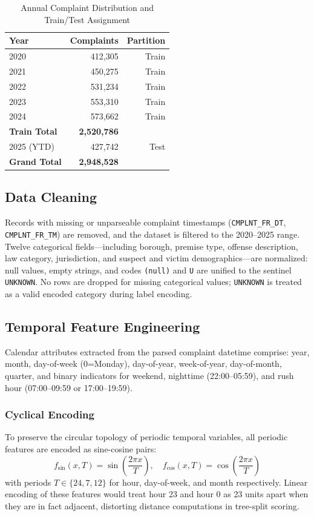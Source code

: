 \documentclass[conference]{IEEEtran}
\begin{document}
\begin{table}[h]
\centering
\caption{Annual Complaint Distribution and Train/Test Assignment}
\label{tab:dataset_stats}
\begin{tabular}{@{}lrr@{}}
\toprule
\textbf{Year} & \textbf{Complaints} & \textbf{Partition} \\
\midrule
2020 & 412,305 & Train \\
2021 & 450,275 & Train \\
2022 & 531,234 & Train \\
2023 & 553,310 & Train \\
2024 & 573,662 & Train \\
\midrule
\textbf{Train Total} & \textbf{2,520,786} & \\
\midrule
2025 (YTD) & 427,742 & Test \\
\midrule
\textbf{Grand Total} & \textbf{2,948,528} & \\
\bottomrule
\end{tabular}
\end{table}

\subsection{Data Cleaning}

Records with missing or unparseable complaint timestamps (\texttt{CMPLNT\_FR\_DT}, \texttt{CMPLNT\_FR\_TM}) are removed, and the dataset is filtered to the 2020--2025 range. Twelve categorical fields—including borough, premise type, offense description, law category, jurisdiction, and suspect and victim demographics—are normalized: null values, empty strings, and codes \texttt{(null)} and \texttt{U} are unified to the sentinel \texttt{UNKNOWN}. No rows are dropped for missing categorical values; \texttt{UNKNOWN} is treated as a valid encoded category during label encoding.

\subsection{Temporal Feature Engineering}

Calendar attributes extracted from the parsed complaint datetime comprise: year, month, day-of-week (0=Monday), day-of-year, week-of-year, day-of-month, quarter, and binary indicators for weekend, nighttime (22:00--05:59), and rush hour (07:00--09:59 or 17:00--19:59).

\subsubsection{Cyclical Encoding}
To preserve the circular topology of periodic temporal variables, all periodic features are encoded as sine-cosine pairs:
\begin{equation}
  f_\text{sin}(x, T) = \sin\!\left(\frac{2\pi x}{T}\right), \quad
  f_\text{cos}(x, T) = \cos\!\left(\frac{2\pi x}{T}\right)
\end{equation}
with periods $T \in \{24, 7, 12\}$ for hour, day-of-week, and month respectively. Linear encoding of these features would treat hour 23 and hour 0 as 23 units apart when they are in fact adjacent, distorting distance computations in tree-split scoring.
\end{document}
